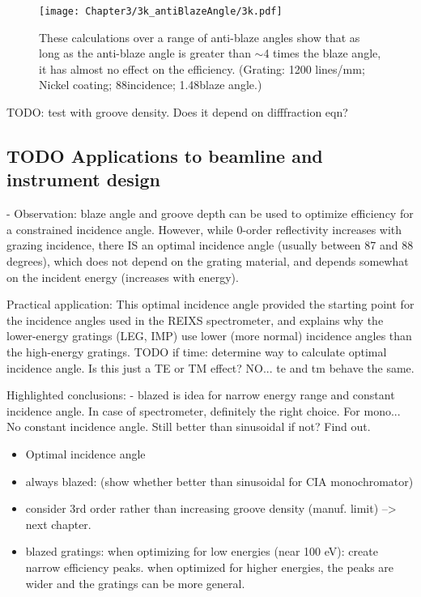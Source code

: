 \begin{figure}[htbp] %
   \centering
   \texttt{[image: Chapter3/3k\_antiBlazeAngle/3k.pdf]} 
   \caption[These calculations over a range of anti-blaze angles show that as long as the anti-blaze angle is greater than $\sim$4 times the blaze angle, it has almost no effect on the efficiency.]{These calculations over a range of anti-blaze angles show that as long as the anti-blaze angle is greater than $\sim$4 times the blaze angle, it has almost no effect on the efficiency.  (Grating: 1200 lines/mm; Nickel coating; 88\dg incidence; 1.48\dg blaze angle.)}
   \label{3k}
\end{figure}

TODO: test with groove density. Does it depend on difffraction eqn?
	
\subsection{TODO Applications to beamline and instrument design}
	- Observation: blaze angle and groove depth can be used to optimize efficiency for a constrained incidence angle.  However, while 0-order reflectivity increases with grazing incidence, there IS an optimal incidence angle (usually between 87 and 88 degrees), which does not depend on the grating material, and depends somewhat on the incident energy (increases with energy).  
	
	Practical application: This optimal incidence angle provided the starting point for the incidence angles used in the REIXS spectrometer, and explains why the lower-energy gratings (LEG, IMP) use lower (more normal) incidence angles than the high-energy gratings.
	TODO if time: determine way to calculate optimal incidence angle.  Is this just a TE or TM effect? NO... te and tm behave the same.
	
	
Highlighted conclusions:
	- blazed is idea for narrow energy range and constant incidence angle.  In case of spectrometer, definitely the right choice.  For mono... No constant incidence angle.  Still better than sinusoidal if not?  Find out.
	
\begin{itemize}
\item Optimal incidence angle
\item always blazed: (show whether better than sinusoidal for CIA monochromator)
\item consider 3rd order rather than increasing groove density (manuf. limit) --> next chapter.
\item blazed gratings: when optimizing for low energies (near 100 eV): create narrow efficiency peaks. when optimized for higher energies, the peaks are wider and the gratings can be more general.
\end{itemize}

